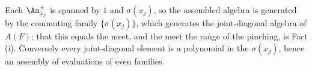 Each $\Aa_{x_j}^{+}$ is spanned by $1$ and $\sigma(x_j)$, so the assembled algebra is generated by the commuting family $\{\sigma(x_j)\}$, which generates the joint-diagonal algebra of $A(F)$; that this equals the meet, and the meet the range of the pinching, is Fact (i). Conversely every joint-diagonal element is a polynomial in the $\sigma(x_j)$, hence an assembly of evaluations of even families.
